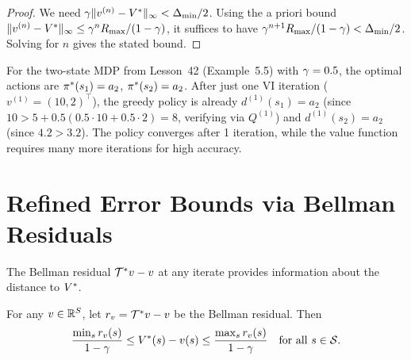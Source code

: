 \documentclass[11pt,a4paper]{article}
\begin{document}
\begin{proof}
We need $\gamma \|v^{(n)} - V^*\|_\infty < \Delta_{\min}/2$.
Using the a priori bound $\|v^{(n)} - V^*\|_\infty \leq
\gamma^n R_{\max}/(1-\gamma)$, it suffices to have
$\gamma^{n+1} R_{\max}/(1-\gamma) < \Delta_{\min}/2$. Solving
for $n$ gives the stated bound.
\end{proof}

\begin{example}
\label{ex:early-policy}
For the two-state MDP from Lesson~42 (Example~5.5) with
$\gamma = 0.5$, the optimal actions are
$\pi^*(s_1) = a_2$, $\pi^*(s_2) = a_2$. After just one
VI iteration ($v^{(1)} = (10, 2)^\top$), the greedy policy is
already $d^{(1)}(s_1) = a_2$ (since $10 > 5 + 0.5(0.5 \cdot 10
+ 0.5 \cdot 2) = 8$, verifying via $Q^{(1)}$) and
$d^{(1)}(s_2) = a_2$ (since $4.2 > 3.2$). The policy converges
after 1 iteration, while the value function requires many more
iterations for high accuracy.
\end{example}


\section{Refined Error Bounds via Bellman Residuals}
\label{sec:refined-bounds}

The Bellman residual $\mathcal{T}^* v - v$ at any iterate provides
information about the distance to $V^*$.

\begin{theorem}
\label{thm:bellman-residual}
For any $v \in \mathbb{R}^S$, let $r_v = \mathcal{T}^* v - v$ be the Bellman
residual. Then
\[
    \frac{\min_s r_v(s)}{1-\gamma}
    \leq V^*(s) - v(s)
    \leq \frac{\max_s r_v(s)}{1-\gamma}
    \quad \text{for all } s \in \mathcal{S}.
\]
\end{theorem}
\end{document}
